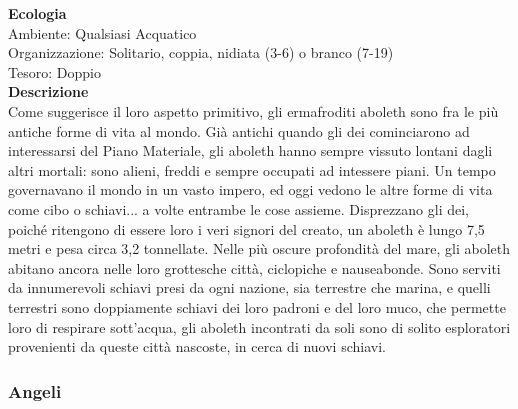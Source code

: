 \begin{multicols}{2}
\textbf{Ecologia}\\
Ambiente: Qualsiasi Acquatico\\
Organizzazione: Solitario, coppia, nidiata (3-6) o branco (7-19)\\
Tesoro: Doppio\\
\textbf{Descrizione}\\
Come suggerisce il loro aspetto primitivo, gli ermafroditi aboleth sono fra le più antiche forme di vita al mondo. Già antichi quando gli dei cominciarono ad interessarsi del Piano Materiale, gli aboleth hanno sempre vissuto lontani dagli altri mortali: sono alieni, freddi e sempre occupati ad intessere piani. Un tempo governavano il mondo in un vasto impero, ed oggi vedono le altre forme di vita come cibo o schiavi... a volte entrambe le cose assieme. Disprezzano gli dei, poiché ritengono di essere loro i veri signori del creato, un aboleth è lungo 7,5 metri e pesa circa 3,2 tonnellate. Nelle più oscure profondità del mare, gli aboleth abitano ancora nelle loro grottesche città, ciclopiche e nauseabonde. Sono serviti da innumerevoli schiavi presi da ogni nazione, sia terrestre che marina, e quelli terrestri sono doppiamente schiavi dei loro padroni e del loro muco, che permette loro di respirare sott'acqua, gli aboleth incontrati da soli sono di solito esploratori provenienti da queste città nascoste, in cerca di nuovi schiavi.\\


\subsubsection{Angeli}


\end{multicols}
